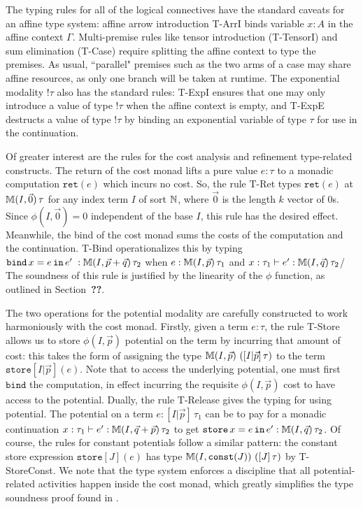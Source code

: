 The typing rules for all of the logical connectives have the standard caveats for an affine type system: affine arrow introduction T-ArrI binds variable $x : A$ in the affine context $\Gamma$. Multi-premise rules like tensor introduction (T-TensorI) and sum elimination (T-Case) require splitting the affine context to type the premises. As usual, ``parallel" premises such as the two arms of a case may share affine resources, as only one branch will be taken at runtime. The exponential modality $!\tau$ also has the standard rules: T-ExpI ensures that one may only introduce a value of type $!\tau$ when the affine context is empty, and T-ExpE destructs a value of type $!\tau$ by binding an exponential variable of type $\tau$ for use in the continuation.

Of greater interest are the rules for the cost analysis and refinement type-related constructs. The return of the cost monad lifts a pure value $e : \tau$ to a monadic computation $\texttt{ret}(e)$ which incurs no cost. So, the rule T-Ret types $\texttt{ret}(e)$ at $\mathbb{M}(I,\vec{0}) \, \tau$ for any index term $I$ of sort $\mathbb{N}$, where $\vec{0}$ is the length $k$ vector of $0$s. Since $\phi(I,\vec{0}) = 0$ independent of the base $I$, this rule has the desired effect. Meanwhile, the bind of the cost monad sums the costs of the computation and the continuation. T-Bind operationalizes this by typing $\texttt{bind}\, x = e \, \texttt{in} \, e' \; : \mathbb{M}(I,\vec{p} + \vec{q}) \, \tau_2$ when $e : \mathbb{M}(I,\vec{p}) \, \tau_1$ and $x : \tau_1 \vdash e' : \mathbb{M}(I,\vec{q}) \, \tau_2$/ The soundness of this rule is justified by the linearity of the $\phi$ function, as outlined in Section~\textbf{??}.

The two operations for the potential modality are carefully constructed to work harmoniously with the cost monad. Firstly, given a term $e : \tau$, the rule T-Store allows us to store $\phi(I,\vec{p})$ potential on the term by incurring that amount of cost: this takes the form of assigning the type $\mathbb{M}(I,\vec{p}) \, \left([I|\vec{p}] \, \tau\right)$ to the term $\texttt{store}[I|\vec{p}](e)$. Note that to access the underlying potential, one must first $\texttt{bind}$ the computation, in effect incurring the requisite $\phi(I,\vec{p})$ cost to have access to the potential. Dually, the rule T-Release gives the typing for using potential. The potential on a term $e : [I|\vec{p}] \, \tau_1$ can be to pay for a monadic continuation $x : \tau_1 \vdash e' : \mathbb{M}(I,\vec{q} + \vec{p}) \, \tau_2$ to get
$\texttt{store}\, x = e \, \texttt{in} \, e' : \mathbb{M}(I,\vec{q}) \, \tau_2$. Of course, the rules for constant potentials follow a similar pattern: the constant store expression $\texttt{store}[J](e)$ has type $\mathbb{M}(I,\texttt{const}(J)) \, \left([J] \, \tau\right)$ by T-StoreConst.
We note that the type system enforces a discipline that all potential-related activities happen inside the cost monad, which greatly simplifies the type soundness proof found in \citet{rajani-et-al:popl21}.

